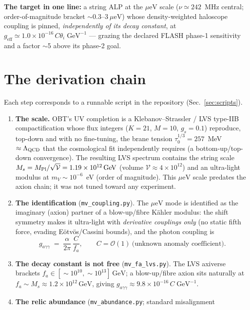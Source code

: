 \documentclass[11pt]{article}
\newcommand{\geff}{g_{\mathrm{eff}}}
\newcommand{\gagg}{g_{a\gamma\gamma}}
\newcommand{\ueV}{\mu\mathrm{eV}}
\newcommand{\GeV}{\mathrm{GeV}}
\begin{document}
\medskip
\noindent\textbf{The target in one line:} a string ALP at the $\ueV$ scale ($\nu\simeq 242$~MHz
central; order-of-magnitude bracket $\sim0.3$--$3~\ueV$) whose density-weighted haloscope coupling is
pinned, \emph{independently of its decay constant}, at
$\geff \simeq 1.0\times10^{-16}\,C\theta_i\;\GeV^{-1}$ --- grazing the declared FLASH phase-1
sensitivity and a factor $\sim$5 above its phase-2 goal.

\section{The derivation chain}
Each step corresponds to a runnable script in the repository (Sec.~\ref{sec:scripts}).

\begin{enumerate}
\item \textbf{The scale.} OBT's UV completion is a Klebanov--Strassler / LVS type-IIB
compactification whose flux integers ($K=21$, $M=10$, $g_s=0.1$) reproduce, top-down and with no
fine-tuning, the brane tension $\tau_0^{1/3} = 257$~MeV~$\approx \Lambda_{\rm QCD}$ that the
cosmological fit independently requires (a bottom-up/top-down convergence). The resulting LVS
spectrum contains the string scale $M_s = M_{\rm Pl}/\sqrt{\mathcal V} = 1.19\times10^{12}\,\GeV$
(volume $\mathcal V \approx 4\times10^{12}$) and an ultra-light modulus at
$m_V \sim 10^{-6}$~eV (order of magnitude). This $\ueV$ scale predates the axion chain; it was not
tuned toward any experiment.
\item \textbf{The identification} (\texttt{mv\_coupling.py}). The $\ueV$ mode is identified as the
imaginary (axion) partner of a blow-up/fibre K\"ahler modulus: the shift symmetry makes it
ultra-light with \emph{derivative couplings only} (no static fifth force, evading E\"otv\"os/Cassini
bounds), and the photon coupling is
\begin{equation}
\gagg \;=\; \frac{\alpha}{2\pi}\,\frac{C}{f_a},
\qquad C = \mathcal{O}(1)\ \text{(unknown anomaly coefficient).}
\end{equation}
\item \textbf{The decay constant is not free} (\texttt{mv\_fa\_lvs.py}). The LVS axiverse
\cite{CGR2012} brackets $f_a \in [\sim\!10^{10}, \sim\!10^{13}]\,\GeV$; a blow-up/fibre axion sits
naturally at $f_a \sim M_s \approx 1.2\times10^{12}\,\GeV$, giving
$\gagg \approx 9.8\times10^{-16}\,C\;\GeV^{-1}$.
\item \textbf{The relic abundance} (\texttt{mv\_abundance.py}; standard misalignment

\end{enumerate}
\end{document}
